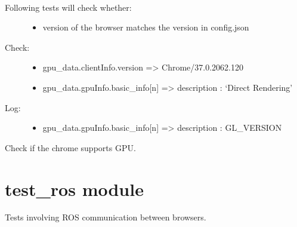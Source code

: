 \documentclass[letterpaper,10pt,english]{sphinxmanual}
\begin{document}
\begin{fulllineitems}
\label{test_platform:test_platform.TestPlatform}~\begin{description}
\item[{Following tests will check whether:}] \leavevmode\begin{itemize}
\item {} 
version of the browser matches the version in config.json

\end{itemize}

\item[{Check:}] \leavevmode\begin{itemize}
\item {} 
gpu\_data.clientInfo.version =\textgreater{} Chrome/37.0.2062.120

\item {} 
gpu\_data.gpuInfo.basic\_info{[}n{]} =\textgreater{} description : `Direct Rendering'

\end{itemize}

\item[{Log:}] \leavevmode\begin{itemize}
\item {} 
gpu\_data.gpuInfo.basic\_info{[}n{]} =\textgreater{} description : GL\_VERSION

\end{itemize}

\end{description}

\begin{fulllineitems}
\label{test_platform:test_platform.TestPlatform.test_get_chrome_gpu_data}
Check if the chrome supports GPU.

\end{fulllineitems}


\end{fulllineitems}



\section{test\_ros module}
\label{test_ros:module-test_ros}\label{test_ros::doc}\label{test_ros:test-ros-module}
Tests involving ROS communication between browsers.
\end{document}
